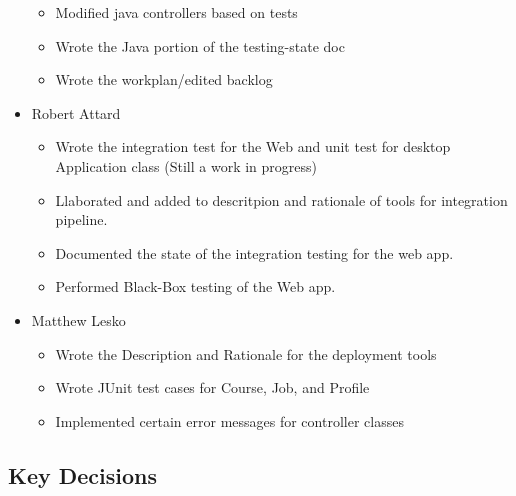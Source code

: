 \documentclass[12pt]{article}
\begin{document}
\begin{itemize}
\begin{itemize}
            \item Modified java controllers based on tests
            \item Wrote the Java portion of the testing-state doc
            \item Wrote the workplan/edited backlog
        \end{itemize}
     \item Robert Attard
     \begin{itemize}
         \item Wrote the integration test for the Web and unit test for desktop Application class (Still a work in progress)
         \item Llaborated and added to descritpion and rationale of tools for integration pipeline.
         \item Documented the state of the integration testing for the web app.
         \item Performed Black-Box testing of the Web app.
     \end{itemize}
     \item Matthew Lesko
     \begin{itemize}
        \item Wrote the Description and Rationale for the deployment tools 
        \item Wrote JUnit test cases for Course, Job, and Profile
        \item Implemented certain error messages for controller classes
     \end{itemize}
 \end{itemize}

 \subsection{Key Decisions}

\end{document}
